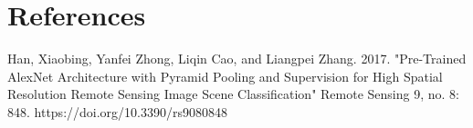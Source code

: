 \chapter{References}
\label{References}
\thispagestyle{empty}

Han, Xiaobing, Yanfei Zhong, Liqin Cao, and Liangpei Zhang. 2017. "Pre-Trained AlexNet Architecture with Pyramid Pooling and Supervision for High Spatial Resolution Remote Sensing Image Scene Classification" Remote Sensing 9, no. 8: 848. https://doi.org/10.3390/rs9080848